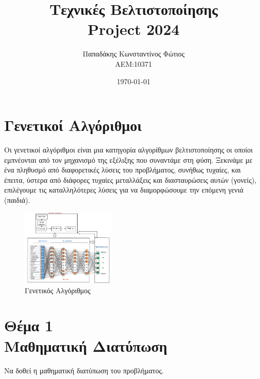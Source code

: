 \documentclass[twocolumn]{report}
\begin{document}

\title{\Huge \bfseries Τεχνικές Βελτιστοποίησης \\ Project 2024} %
\author{Παπαδάκης Κωνσταντίνος Φώτιος\vspace{0.5cm} \\  ΑΕΜ:10371} %
\date{\today}
\maketitle

\section*{Γενετικοί Αλγόριθμοι}
Οι γενετικοί αλγόριθμοι είναι μια κατηγορία αλγορίθμων βελτιστοποίησης οι
οποίοι εμπνέονται από τον μηχανισμό της εξέλιξης που συναντάμε στη φύση.
Ξεκινάμε με ένα πληθυσμό από διαφορετικές λύσεις του προβλήματος, συνήθως 
τυχαίες, και έπειτα, ύστερα από διάφορες τυχαίες μεταλλάξεις και διασταυρώσεις 
αυτών (γονείς), επιλέγουμε τις καταλληλότερες λύσεις για να διαμορφώσουμε 
την επόμενη γενιά (παιδιά).
\begin{figure}[H]
    \centering
    \includegraphics[width=0.4\textwidth]{media/genetic_algorithm.png}
    \caption{Γενετικός Αλγόριθμος}
\end{figure}

\section*{Θέμα 1\\Μαθηματική Διατύπωση}
Να δοθεί η μαθηματική διατύπωση του προβλήματος.
\end{document}
